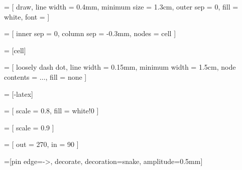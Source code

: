 \newcommand{\true}{\textcolor{green}{\ding{51}}}
\newcommand{\false}{\textcolor{red}{\ding{55}}}

 = [
  draw,
  line width = 0.4mm,
  minimum size = 1.3cm,
  outer sep = 0,
  fill = white,
  font = \large
]

 = [
  inner sep = 0,
  column sep = -0.3mm,
  nodes = cell
]

 = [cell]

 = [
  loosely dash dot,
  line width = 0.15mm,
  minimum width = 1.5cm,
  node contents = $\ldots$,
  fill = none
]

\newcommand{\ellipsis}{ \node [ellipsis]; }

 = [-latex]

 = [
  scale = 0.8,
  fill = white!0
]

 = [
  scale = 0.9
]

 = [
  out = 270,
  in = 90
]

=[pin edge={->, decorate, decoration={snake, amplitude=0.5mm}}]
